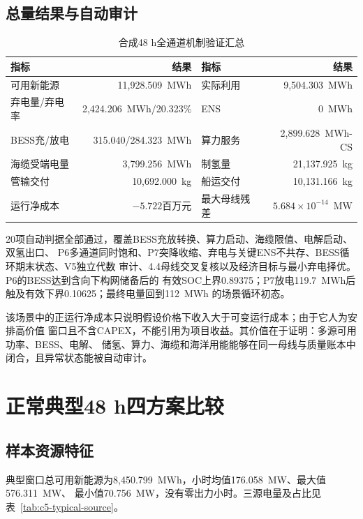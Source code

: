 \subsection{总量结果与自动审计}

\begin{table}[htbp]
\centering
\caption{合成48 h全通道机制验证汇总}
\label{tab:c5-mechanism-summary}
\begin{tabular}{lrlr}
\toprule
指标 & 结果 & 指标 & 结果\\
\midrule
可用新能源 & 11,928.509~MWh & 实际利用 & 9,504.303~MWh\\
弃电量/弃电率 & 2,424.206~MWh/20.323\% & ENS & 0~MWh\\
BESS充/放电 & 315.040/284.323~MWh & 算力服务 & 2,899.628~MWh-CS\\
海缆受端电量 & 3,799.256~MWh & 制氢量 & 21,137.925~kg\\
管输交付 & 10,692.000~kg & 船运交付 & 10,131.166~kg\\
运行净成本 & $-5.722$百万元 & 最大母线残差 & $5.684\times10^{-14}$~MW\\
\bottomrule
\end{tabular}
\end{table}

20项自动判据全部通过，覆盖BESS充放转换、算力启动、海缆限值、电解启动、双氢出口、
P6多通道同时饱和、P7突降收缩、弃电与关键ENS不共存、BESS循环期末状态、V5独立代数
审计、4.4母线交叉复核以及经济目标与最小弃电择优。P6的BESS达到含向下构网储备后的
有效SOC上界0.89375；P7放电119.7~MWh后触及有效下界0.10625；最终电量回到112~MWh
的场景循环初态。

该场景中的正运行净成本只说明假设价格下收入大于可变运行成本；由于它人为安排高价值
窗口且不含CAPEX，不能引用为项目收益。其价值在于证明：多源可用功率、BESS、电解、
储氢、算力、海缆和海洋用能能够在同一母线与质量账本中闭合，且异常状态能被自动审计。

\section{正常典型48 h四方案比较}

\subsection{样本资源特征}

典型窗口总可用新能源为8,450.799~MWh，小时均值176.058~MW、最大值576.311~MW、
最小值70.756~MW，没有零出力小时。三源电量及占比见表~\ref{tab:c5-typical-source}。

